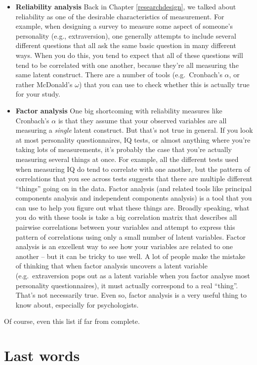 \documentclass[
]{book}
\theoremstyle{definition}
\theoremstyle{definition}
\theoremstyle{definition}
\theoremstyle{definition}
\theoremstyle{remark}
\begin{document}
\begin{itemize}
\item
  \textbf{Reliability analysis} Back in Chapter \ref{researchdesign}, we talked about reliability as one of the desirable characteristics of measurement. For example, when designing a survey to measure some aspect of someone's personality (e.g., extraversion), one generally attempts to include several different questions that all ask the same basic question in many different ways. When you do this, you tend to expect that all of these questions will tend to be correlated with one another, because they're all measuring the same latent construct. There are a number of tools (e.g.~Cronbach's \(\alpha\), or rather McDonald's \(\omega\)) that you can use to check whether this is actually true for your study.
\item
  \textbf{Factor analysis} One big shortcoming with reliability measures like Cronbach's \(\alpha\) is that they assume that your observed variables are all measuring a \emph{single} latent construct. But that's not true in general. If you look at most personality questionnaires, IQ tests, or almost anything where you're taking lots of measurements, it's probably the case that you're actually measuring several things at once. For example, all the different tests used when measuring IQ do tend to correlate with one another, but the pattern of correlations that you see across tests suggests that there are multiple different ``things'' going on in the data. Factor analysis (and related tools like principal components analysis and independent components analysis) is a tool that you can use to help you figure out what these things are. Broadly speaking, what you do with these tools is take a big correlation matrix that describes all pairwise correlations between your variables and attempt to express this pattern of correlations using only a small number of latent variables. Factor analysis is an excellent way to see how your variables are related to one another -- but it can be tricky to use well. A lot of people make the mistake of thinking that when factor analysis uncovers a latent variable (e.g.~extraversion pops out as a latent variable when you factor analyse most personality questionnaires), it must actually correspond to a real ``thing''. That's not necessarily true. Even so, factor analysis is a very useful thing to know about, especially for psychologists.
\end{itemize}

Of course, even this list if far from complete.

\hypertarget{last-words}{%
\section*{Last words}\label{last-words}}
\end{document}
